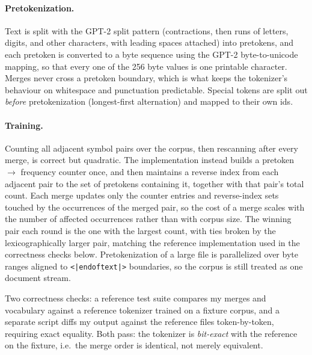 \documentclass{article}
\newcommand{\eot}{\texttt{<|endoftext|>}}
\begin{document}
\paragraph{Pretokenization.} Text is split with the GPT-2 split pattern \citep{bpe,gpt2} (contractions, then runs of letters, digits, and other characters, with leading spaces attached) into pretokens, and each pretoken is converted to a byte sequence using the GPT-2 byte-to-unicode mapping, so that every one of the 256 byte values is one printable character. Merges never cross a pretoken boundary, which is what keeps the tokenizer's behaviour on whitespace and punctuation predictable. Special tokens are split out \emph{before} pretokenization (longest-first alternation) and mapped to their own ids.

\paragraph{Training.} Counting all adjacent symbol pairs over the corpus, then rescanning after every merge, is correct but quadratic. The implementation instead builds a pretoken $\rightarrow$ frequency counter once, and then maintains a reverse index from each adjacent pair to the set of pretokens containing it, together with that pair's total count. Each merge updates only the counter entries and reverse-index sets touched by the occurrences of the merged pair, so the cost of a merge scales with the number of affected occurrences rather than with corpus size. The winning pair each round is the one with the largest count, with ties broken by the lexicographically larger pair, matching the reference implementation used in the correctness checks below. Pretokenization of a large file is parallelized over byte ranges aligned to \eot{} boundaries, so the corpus is still treated as one document stream.

Two correctness checks: a reference test suite compares my merges and vocabulary against a reference tokenizer trained on a fixture corpus, and a separate script diffs my output against the reference files token-by-token, requiring exact equality. Both pass: the tokenizer is \emph{bit-exact} with the reference on the fixture, i.e.\ the merge order is identical, not merely equivalent.
\end{document}

